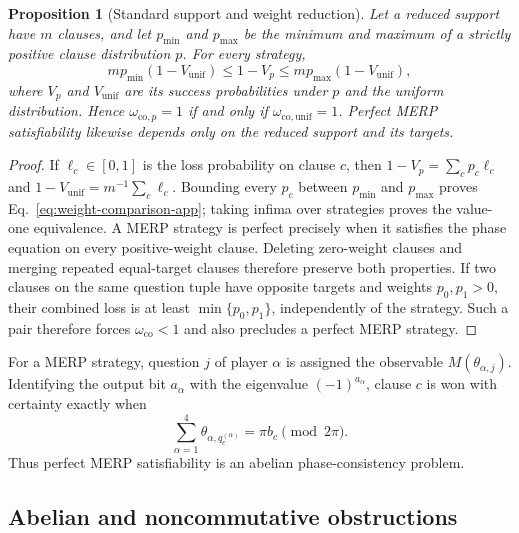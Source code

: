 \documentclass[11pt]{article}
\newtheorem{proposition}[theorem]{Proposition}
\theoremstyle{definition}
\theoremstyle{remark}
\newcommand{\co}{\mathrm{co}}
\newcommand{\unif}{\mathrm{unif}}
\numberwithin{equation}{section}
\begin{document}
\begin{proposition}[Standard support and weight reduction]
\label{prop:weight-reduction}
Let a reduced support have \(m\) clauses, and let \(p_{\min}\) and
\(p_{\max}\) be the minimum and maximum of a strictly positive clause
distribution \(p\).  For every strategy,
\begin{equation}\label{eq:weight-comparison-app}
 m p_{\min}(1-V_{\unif})
 \leq 1-V_p
 \leq m p_{\max}(1-V_{\unif}),
\end{equation}
where \(V_p\) and \(V_{\unif}\) are its success probabilities under \(p\)
and the uniform distribution.  Hence \(\omega_{\co,p}=1\) if and only if
\(\omega_{\co,\unif}=1\).  Perfect MERP satisfiability likewise depends
only on the reduced support and its targets.
\end{proposition}

\begin{proof}
If \(\ell_c\in[0,1]\) is the loss probability on clause \(c\), then
\(1-V_p=\sum_c p_c\ell_c\) and
\(1-V_{\unif}=m^{-1}\sum_c\ell_c\).  Bounding every \(p_c\) between
\(p_{\min}\) and \(p_{\max}\) proves Eq.~\eqref{eq:weight-comparison-app};
taking infima over strategies proves the value-one equivalence.  A MERP
strategy is perfect precisely when it satisfies the phase equation on every
positive-weight clause.  Deleting zero-weight clauses and merging repeated
equal-target clauses therefore preserve both properties.  If two clauses on
the same question tuple have opposite targets and weights \(p_0,p_1>0\),
their combined loss is at least \(\min\{p_0,p_1\}\), independently of the
strategy.  Such a pair therefore forces \(\omega_{\co}<1\) and also precludes
a perfect MERP strategy.
\end{proof}

For a MERP strategy, question \(j\) of player \(\alpha\) is assigned the
observable \(M(\theta_{\alpha,j})\).  Identifying the output bit
\(a_\alpha\) with the eigenvalue \((-1)^{a_\alpha}\), clause \(c\) is won
with certainty exactly when
\begin{equation}\label{eq:merp-phase}
  \sum_{\alpha=1}^{4}
  \theta_{\alpha,q_c^{(\alpha)}}
  =\pi b_c\pmod{2\pi}.
\end{equation}
Thus perfect MERP satisfiability is an abelian phase-consistency problem.

\subsection{Abelian and noncommutative obstructions}
\label{sec:obstructions}
\end{document}
